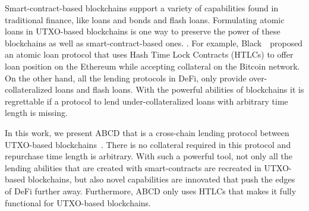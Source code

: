 \documentclass[conference,compsoc]{IEEEtran}
\begin{document}
Smart-contract-based blockchains support a variety of capabilities found in traditional finance, like loans and bonds and flash loans. Formulating atomic loans in UTXO-based blockchains is one way to preserve the power of these blockchains as well as smart-contract-based ones. \cite{tefaghcapital}. For example, Black~\etal~proposed an atomic loan protocol \cite{black2019atomic} that uses Hash Time Lock Contracts (HTLCs) to offer loan position on the Ethereum while accepting collateral on the Bitcoin network.
On the other hand, all the lending protocols in DeFi, only provide over-collateralized loans and flash loans. With the powerful abilities of blockchains it is regrettable if a protocol to lend under-collateralized loans with arbitrary time length is missing. 


In this work, we present ABCD that is a cross-chain lending protocol between UTXO-based blockchains~\cite{tefagh2020atomic}.
There is no collateral required in this protocol and repurchase time length is arbitrary. With such a powerful tool, not only all the lending abilities that are created with smart-contracts are recreated in UTXO-based blockchains, but also novel capabilities are innovated that push the edges of DeFi further away.
Furthermore, ABCD only uses HTLCs that makes it fully functional for UTXO-based blockchains. 
\end{document}
